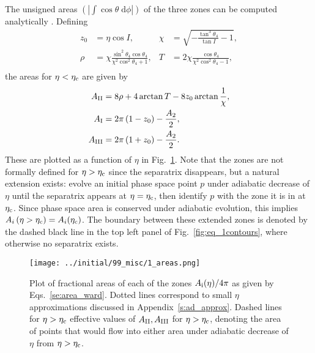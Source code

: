 \documentclass[
        fleqn,
        usenatbib,
        referee,
    ]{mnras}
\newcommand*{\abs}[1]{\left|#1\right|}
\newcommand*{\p}[1]{\left(#1\right)}
\begin{document}
The unsigned areas $\p{\abs{\int \cos \theta \;\mathrm{d}\phi}}$ of the three
zones can be computed analytically \citep{henrard1987,ward2004I}. Defining
\begin{subequations}
    \begin{align}
        z_0 &= \eta\cos I, &
        \chi &= \sqrt{-\frac{\tan^3\theta_4}{\tan I} - 1},\\
        \rho &= \chi \frac{\sin^2 \theta_4\cos \theta_4}{
            \chi^2 \cos^2\theta_4 + 1},&
        T &= 2\chi \frac{\cos \theta_4}{
            \chi^2 \cos^2\theta_4 - 1},\\
    \end{align}
\end{subequations}
the areas for $\eta < \eta_{\rm c}$ are given by
\begin{subequations}\label{se:area_ward}
    \begin{align}
        A_{\rm II} &= 8\rho + 4\arctan T - 8z_0 \arctan \frac{1}{\chi},\\
        A_{\rm I} &= 2\pi\p{1 - z_0} - \frac{A_2}{2},\\
        A_{\rm III} &= 2\pi\p{1 + z_0} - \frac{A_2}{2}.
    \end{align}
\end{subequations}
These are plotted as a function of $\eta$ in Fig.~\ref{fig:eq_areas}. Note that
the zones are not formally defined for $\eta > \eta_{\rm c}$ since the
separatrix disappears, but a natural extension exists: evolve an initial phase
space point $p$ under adiabatic decrease of $\eta$ until the separatrix appears
at $\eta = \eta_{\rm c}$, then identify $p$ with the zone it is in at $\eta_{\rm
c}$. Since phase space area is conserved under adiabatic evolution, this implies
$A_i\p{\eta > \eta_{\rm c}} = A_i(\eta_{\rm c})$. The boundary between these
extended zones is denoted by the dashed black line in the top left panel of
Fig.~\ref{fig:eq_1contours}, where otherwise no separatrix exists.
\begin{figure}
    \centering
    \texttt{[image: ../initial/99\_misc/1\_areas.png]}
    \caption{Plot of fractional areas of each of the zones $A_{\rm i}(\eta) /
    4\pi$ as given by Eqs.~\eqref{se:area_ward}. Dotted lines correspond to
    small $\eta$ approximations discussed in Appendix~\ref{s:ad_approx}. Dashed
    lines for $\eta > \eta_{\rm c}$ effective values of $A_{\rm II}, A_{\rm
    III}$ for $\eta > \eta_{\rm c}$, denoting the area of points that would flow
    into either area under adiabatic decrease of $\eta$ from $\eta > \eta_{\rm
    c}$.}\label{fig:eq_areas}
\end{figure}
\end{document}
